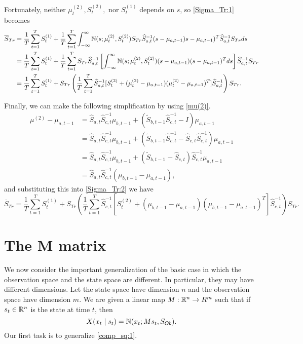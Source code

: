 \documentclass[12pt,leqno]{article}
\begin{document}
Fortunately, neither $\mu^{(2)}_t,S^{(2)}_t,$ nor $S^{(1)}_t$ depends on $s$,
so \eqref{Sigma_Tr:1} becomes
\begin{align}
  \overline{S}_{Tr} &= \frac{1}{T}\sum_{t=1}^TS^{(1)}_t + \frac{1}{T}\sum_{t=1}^T
    \int_{-\infty}^{\infty}{\mathbb N}(s;\mu^{(2)}_t,S^{(2)}_t)S_{Tr}\widehat{S}_{a,t}^{-1}(s-\mu_{a,t-1})
    s-\mu_{a,t-1})^T\widehat{S}_{a,t}^{-1}S_{Tr}ds\notag\\
    &=\frac{1}{T}\sum_{t=1}^TS^{(1)}_t +\frac{1}{T}\sum_{t=1}^TS_{Tr}\widehat{S}_{a,t}^{-1}
    \left[\int_{-\infty}^{\infty}{\mathbb N}(s;\mu^{(2)}_t,S^{(2)}_t)(s-\mu_{a,t-1})(s-\mu_{a,t-1})^Tds\right]\widehat{S}_{a,t}^{-1}S_{Tr}\notag\\
   &=\frac{1}{T}\sum_{t=1}^TS^{(1)}_t+S_{Tr}\left(\frac{1}{T}\sum_{t=1}^T\widehat{S}_{a,t}^{-1}
   [S^{(2)}_t+(\mu^{(2)}_t-\mu_{a,t-1})(\mu^{(2)}_t-\mu_{a,t-1})^T]\widehat{S}_{a,t}^{-1}\right)S_{Tr}.\label{Sigma_Tr:2}
  \end{align}

Finally, we can make the following simplification by using \eqref{mu(2)}.
\begin{align*}
  \mu^{(2)} - \mu_{a,t-1} &= \widehat{S}_{a,t}\widehat{S}_{c,t}^{-1}\mu_{b,t-1} +
  (\widetilde{S}_{b,t-1}\widehat{S}_{c,t}^{-1}-I)\mu_{a,t-1}\\
  &= \widehat{S}_{a,t}\widehat{S}_{c,t}^{-1}\mu_{b,t-1} +
  (\widetilde{S}_{b,t-1}\widehat{S}_{c,t}^{-1}-\widehat{S}_{c,t}\widehat{S}_{c,t}^{-1})\mu_{a,t-1}\\
  &=  \widehat{S}_{a,t}\widehat{S}_{c,t}^{-1}\mu_{b,t-1} +
  (\widetilde{S}_{b,t-1}-\widehat{S}_{c,t})\widehat{S}_{c,t}^{-1}\mu_{a,t-1}\\
  &= \widehat{S}_{a,t}\widehat{S}_{c,t}^{-1}(\mu_{b,t-1} -\mu_{a,t-1}),
\end{align*}
and substituting this into \eqref{Sigma_Tr:2} we have
\begin{equation}\label{Sigma_Tr:3}
\overline{S}_{Tr}   =\frac{1}{T}\sum_{t=1}^TS^{(1)}_t+S_{Tr}\left(\frac{1}{T}\sum_{t=1}^T\widehat{S}_{c,t}^{-1}
   [S^{(2)}_t+(\mu_{b,t-1}-\mu_{a,t-1})(\mu_{b,t-1}-\mu_{a,t-1})^T]\widehat{S}_{c,t}^{-1}\right)S_{Tr}.
\end{equation}  

\section{The M matrix}
We now consider the important generalization of the basic case in which the observation space and the state space are different.
In particular, they may have different dimensions.  Let the state space have dimension $n$ and the observation space have
dimension $m$.  We are given a linear map $M: {\mathbb R}^n\rightarrow R^m$ such that if $s_t\in {\mathbb R}^n$ is the state at time $t$, then
$$
X(x_t\mid s_t)= {\mathbb N}(x_t;Ms_t,S_{Ob}).
$$
Our first task is to generalize \eqref{comp_sq:1}.
\end{document}
